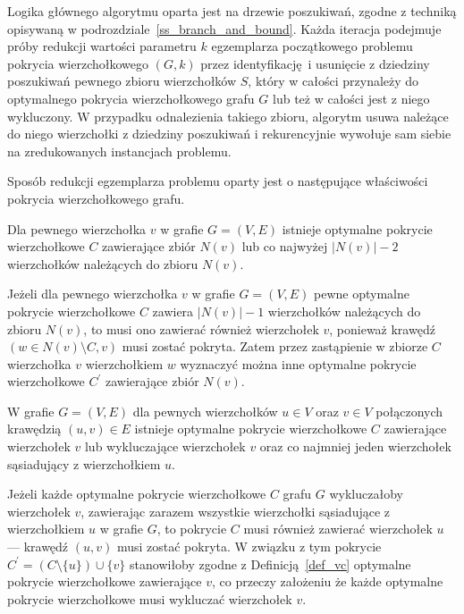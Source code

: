 \par{
  Logika głównego algorytmu oparta jest na drzewie poszukiwań, zgodne z techniką opisywaną w podrozdziale~\ref{ss_branch_and_bound}.
  Każda iteracja podejmuje próby redukcji wartości parametru $k$ egzemplarza początkowego problemu pokrycia wierzchołkowego $(G, k)$ przez identyfikację i usunięcie z dziedziny poszukiwań pewnego zbioru wierzchołków $S$, który w całości przynależy do optymalnego pokrycia wierzchołkowego grafu $G$ lub też w całości jest z niego wykluczony.
  W przypadku odnalezienia takiego zbioru, algorytm usuwa należące do niego wierzchołki z dziedziny poszukiwań i rekurencyjnie wywołuje sam siebie na zredukowanych instancjach problemu.

  Sposób redukcji egzemplarza problemu oparty jest o następujące właściwości pokrycia wierzchołkowego grafu.
  \begin{theorem}
    Dla pewnego wierzchołka $v$ w grafie $G=(V, E)$ istnieje optymalne pokrycie wierzchołkowe $C$ zawierające zbiór $N(v)$ lub co najwyżej $|N(v)| - 2$ wierzchołków należących do zbioru $N(v)$.
  \end{theorem}
  \begin{bproof}
    Jeżeli dla pewnego wierzchołka $v$ w grafie $G=(V, E)$ pewne optymalne pokrycie wierzchołkowe $C$ zawiera $|N(v)|-1$ wierzchołków należących do zbioru $N(v)$, to musi ono zawierać również wierzchołek $v$, ponieważ krawędź $(w \in N(v) \setminus C, v)$ musi zostać pokryta.
    Zatem przez zastąpienie w zbiorze $C$ wierzchołka $v$ wierzchołkiem $w$ wyznaczyć można inne optymalne pokrycie wierzchołkowe $C^\prime$ zawierające zbiór $N(v)$.
  \end{bproof}
  \begin{theorem}
     W grafie $G=(V, E)$ dla pewnych wierzchołków $u \in V$ oraz $v \in V$ połączonych krawędzią $(u, v) \in E$ istnieje optymalne pokrycie wierzchołkowe $C$ zawierające wierzchołek $v$ lub wykluczające wierzchołek $v$ oraz co najmniej jeden wierzchołek sąsiadujący z wierzchołkiem $u$.
  \end{theorem}
  \begin{bproof}
    Jeżeli każde optymalne pokrycie wierzchołkowe $C$ grafu $G$ wykluczałoby wierzchołek $v$, zawierając zarazem wszystkie wierzchołki sąsiadujące z wierzchołkiem $u$ w grafie $G$, to pokrycie $C$ musi również zawierać wierzchołek $u$ --- krawędź $(u, v)$ musi zostać pokryta.
    W związku z tym pokrycie $C^\prime=(C \setminus \{u\}) \cup \{v\}$ stanowiłoby zgodne z Definicją~\ref{def_vc} optymalne pokrycie wierzchołkowe zawierające $v$, co przeczy założeniu że każde optymalne pokrycie wierzchołkowe musi wykluczać wierzchołek $v$.

\end{bproof}}
